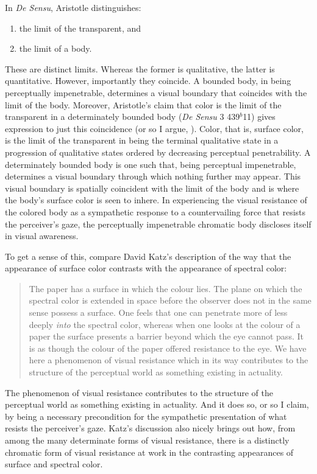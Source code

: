 In \emph{De Sensu}, Aristotle distinguishes:
\begin{enumerate}[(1)]
	\item the limit of the transparent, and
	\item the limit of a body.
\end{enumerate}
These are distinct limits. Whereas the former is qualitative, the latter is quantitative. However, importantly they coincide. A bounded body, in being perceptually impenetrable, determines a visual boundary that coincides with the limit of the body. Moreover, Aristotle’s claim that color is the limit of the transparent in a determinately bounded body (\emph{De Sensu} 3 439\( ^{b} \)11) gives expression to just this coincidence (or so I argue, \citealt[chapter 3.3]{Kalderon:2015fr}). Color, that is, surface color, is the limit of the transparent in being the terminal qualitative state in a progression of qualitative states ordered by decreasing perceptual penetrability. A determinately bounded body is one such that, being perceptual impenetrable, determines a visual boundary through which nothing further may appear. This visual boundary is spatially coincident with the limit of the body and is where the body’s surface color is seen to inhere. In experiencing the visual resistance of the colored body as a sympathetic response to a countervailing force that resists the perceiver's gaze, the perceptually impenetrable chromatic body discloses itself in visual awareness.

To get a sense of this, compare David Katz's description of the way that the appearance of surface color contrasts with the appearance of spectral color:
\begin{quote}
	The paper has a surface in which the colour lies. The plane on which the spectral color is extended in space before the observer does not in the same sense possess a surface. One feels that one can penetrate more of less deeply \emph{into} the spectral color, whereas when one looks at the colour of a paper the surface presents a barrier beyond which the eye cannot pass. It is as though the colour of the paper offered resistance to the eye. We have here a phenomenon of visual resistance which in its way contributes to the structure of the perceptual world as something existing in actuality. \citep[8]{Katz:1935qv}
\end{quote}
The phenomenon of visual resistance contributes to the structure of the perceptual world as something existing in actuality. And it does so, or so I claim, by being a necessary precondition for the sympathetic presentation of what resists the perceiver's gaze. Katz's discussion also nicely brings out how, from among the many determinate forms of visual resistance, there is a distinctly chromatic form of visual resistance at work in the contrasting appearances of surface and spectral color.

